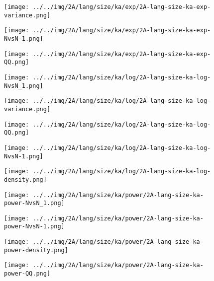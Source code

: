 \begin{figure}[H]
\centering	\texttt{[image: ../../img/2A/lang/size/ka/exp/2A-lang-size-ka-exp-variance.png]}
\end{figure}
\begin{figure}[H]
\centering	\texttt{[image: ../../img/2A/lang/size/ka/exp/2A-lang-size-ka-exp-NvsN-1.png]}
\end{figure}
\begin{figure}[H]
\centering	\texttt{[image: ../../img/2A/lang/size/ka/exp/2A-lang-size-ka-exp-QQ.png]}
\end{figure}
\begin{figure}[H]
\centering	\texttt{[image: ../../img/2A/lang/size/ka/log/2A-lang-size-ka-log-NvsN\_1.png]}
\end{figure}
\begin{figure}[H]
\centering	\texttt{[image: ../../img/2A/lang/size/ka/log/2A-lang-size-ka-log-variance.png]}
\end{figure}
\begin{figure}[H]
\centering	\texttt{[image: ../../img/2A/lang/size/ka/log/2A-lang-size-ka-log-QQ.png]}
\end{figure}
\begin{figure}[H]
\centering	\texttt{[image: ../../img/2A/lang/size/ka/log/2A-lang-size-ka-log-NvsN-1.png]}
\end{figure}
\begin{figure}[H]
\centering	\texttt{[image: ../../img/2A/lang/size/ka/log/2A-lang-size-ka-log-density.png]}
\end{figure}
\begin{figure}[H]
\centering	\texttt{[image: ../../img/2A/lang/size/ka/power/2A-lang-size-ka-power-NvsN\_1.png]}
\end{figure}
\begin{figure}[H]
\centering	\texttt{[image: ../../img/2A/lang/size/ka/power/2A-lang-size-ka-power-NvsN-1.png]}
\end{figure}
\begin{figure}[H]
\centering	\texttt{[image: ../../img/2A/lang/size/ka/power/2A-lang-size-ka-power-density.png]}
\end{figure}
\begin{figure}[H]
\centering	\texttt{[image: ../../img/2A/lang/size/ka/power/2A-lang-size-ka-power-QQ.png]}
\end{figure}
